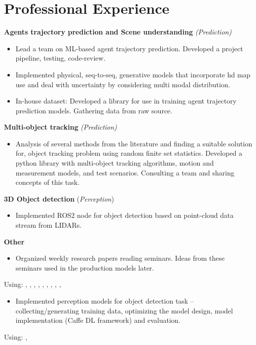 \section*{\sectionformat Professional Experience}
% 

\textbf{Agents trajectory prediction and Scene understanding} \textit{(Prediction)}
\begin{itemize}
    \item Lead a team on ML-based agent trajectory prediction. Developed a project pipeline, testing, code-review.
    \item Implemented physical, seq-to-seq, generative models that incorporate hd map use and deal with uncertainty by considering multi modal distribution.
    \item In-house dataset: Developed a library for use in training agent trajectory prediction models. Gathering data from raw source.
\end{itemize}

\textbf{Multi-object tracking} \textit{(Prediction)}
\begin{itemize}
    \item Analysis of several methods from the literature and finding a suitable solution for, object tracking problem using random finite set statistics. Developed a python library with multi-object tracking algorithms, motion and measurement models, and test scenarios. Consulting a team and sharing concepts of this task.
\end{itemize}

\textbf{3D Object detection} (\textit{Perception})
\begin{itemize}
    \item Implemented ROS2 node for object detection based on point-cloud data stream from LIDARs.
\end{itemize}

\textbf{Other}
\begin{itemize}
    \item Organized weekly research papers reading seminars. Ideas from these seminars used in the production models later.
\end{itemize}

Using: , , ,
, , , , ,
, 
\horizontalline
% 
\begin{itemize}
    \item Implemented perception models for object detection task -- collecting/generating training data, optimizing the model design, model implementation (Caffe DL framework) and evaluation.
\end{itemize}
Using: , 

